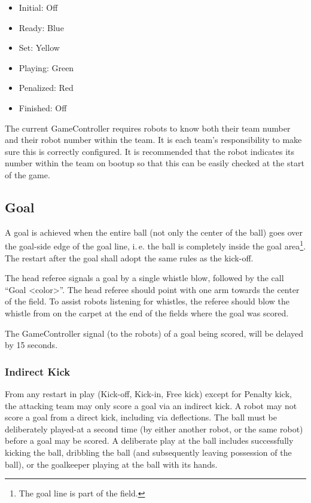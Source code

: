 \documentclass[12pt]{article}
\newcommand{\ie}{\mbox{i.\,e.}\xspace}
\newcommand{\GoalScoredDelay}{15 seconds\xspace}
\begin{document}
\begin{itemize}

\item Initial: Off

\item Ready: Blue

\item Set: Yellow

\item Playing: Green

\item Penalized: Red

\item Finished: Off

\end{itemize}

The current GameController requires robots to know both their team number and their robot number within the team. It is each team's responsibility to make sure this is correctly configured. It is recommended that the robot indicates its number within the team on bootup so that this can be easily checked at the start of the game.

\subsection{Goal}
\label{sec:goal}
A goal is achieved when the entire ball (not only the center of the ball) goes over the goal-side edge of the goal line, \ie the ball is completely inside the goal area\footnote{The goal line is part of the field.}. The restart after the goal shall adopt the same rules as the kick-off.

The head referee signals a goal by a single whistle blow, followed by the call ``Goal \textless color\textgreater''.
The head referee should point with one arm towards the center of the field.
To assist robots listening for whistles, the referee should blow the whistle from on the carpet at the end of the fields where the goal was scored.

The GameController signal (to the robots) of a goal being scored, will be delayed by \GoalScoredDelay.

\subsubsection{Indirect Kick}
\label{sec:indirect_kick}

From any restart in play (Kick-off, Kick-in, Free kick) except for Penalty kick, the attacking team may only score a goal via an indirect kick.
A robot may not score a goal from a direct kick, including via deflections.
The ball must be deliberately played-at a second time (by either another robot, or the same robot) before a goal may be scored.
A deliberate play at the ball includes successfully kicking the ball, dribbling the ball (and subsequently leaving possession of the ball), or the goalkeeper playing at the ball with its hands.
\end{document}
